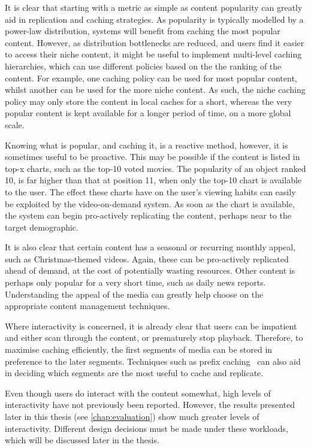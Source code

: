     It is clear that starting with a metric as simple as content popularity can greatly aid in replication and caching strategies. As popularity is typically modelled by a power-law distribution, systems will benefit from caching the most popular content. However, as distribution bottlenecks are reduced, and users find it easier to access their niche content, it might be useful to implement multi-level caching hierarchies, which can use different policies based on the the ranking of the content. For example, one caching policy can be used for most popular content, whilst another can be used for the more niche content. As such, the niche caching policy may only store the content in local caches for a short, whereas the very popular content is kept available for a longer period of time, on a more global scale.

    Knowing what is popular, and caching it, is a reactive method, however, it is sometimes useful to be proactive. This may be possible if the content is listed in top-x charts, such as the top-10 voted movies. The popularity of an object ranked 10\sth, is far higher than that at position 11, when only the top-10 chart is available to the user. The effect these charts have on the user's viewing habits can easily be exploited by the video-on-demand system. As soon as the chart is available, the system can begin pro-actively replicating the content, perhaps near to the target demographic.

    It is also clear that certain content has a seasonal or recurring monthly appeal, such as Christmas-themed videos. Again, these can be pro-actively replicated ahead of demand, at the cost of potentially wasting resources. Other content is perhaps only popular for a very short time, such as daily news reports. Understanding the appeal of the media can greatly help choose on the appropriate content management techniques.

    Where interactivity is concerned, it is already clear that users can be impatient and either scan through the content, or prematurely stop playback. Therefore, to maximise caching efficiently, the first segments of media can be stored in preference to the later segments. Techniques such as prefix caching~\cite{sen99ppc,hofmann1999cts} can also aid in deciding which segments are the most useful to cache and replicate.

    Even though users do interact with the content somewhat, high levels of interactivity have not previously been reported. However, the results presented later in this thesis (see \autoref{chap:evaluation}) show much greater levels of interactivity. Different design decisions must be made under these workloads, which will be discussed later in the thesis.

